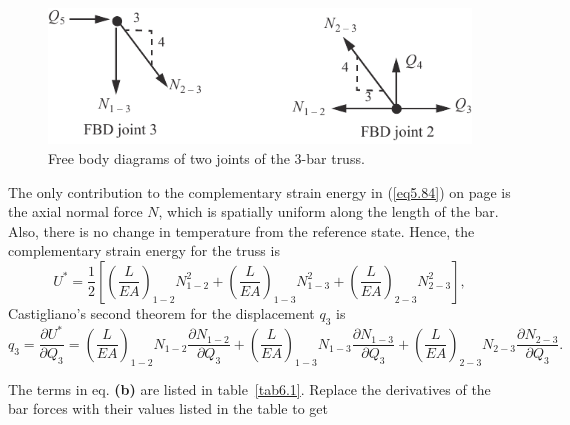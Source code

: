 \documentclass{AeroStructure-ERJohnson}
\begin{document}
\begin{example*}
\begin{figure}[!h]
\centerline{\includegraphics{Figure_6-7.pdf}}
\caption{Free body diagrams of two joints of the 3-bar truss.}\label{fig6.7}
\end{figure}

The only contribution to the complementary strain energy in (\ref{eq5.84}) on page \pageref{eq5.84} is the axial normal force $N$, which is spatially uniform along the length of the bar. Also, there is no change in temperature from the\vadjust{\vspace*{6pt}\pagebreak} reference state. Hence, the complementary strain energy for the truss is
\begin{equation*}
U^{*}=\frac{1}{2}\left[\left(\frac{L}{E A}\right)_{1-2} N_{1-2}^{2}+\left(\frac{L}{E A}\right)_{1-3} N_{1-3}^{2}+\left(\frac{L}{E A}\right)_{2-3} N^{2}_{2-3}\right],\tag{a}
\end{equation*}
Castigliano's second theorem for the displacement $q_3$ is
\begin{equation*}
q_{3}=\frac{\partial U^{*}}{\partial Q_{3}}=\left(\frac{L}{E A}\right)_{1-2} N_{1-2} \frac{\partial N_{1-2}}{\partial Q_{3}}+\left(\frac{L}{E A}\right)_{1-3} N_{1-3} \frac{\partial N_{1-3}}{\partial Q_{3}}+\left(\frac{L}{E A}\right)_{2-3} N_{2-3} \frac{\partial N_{2-3}}{\partial Q_{3}}.\tag{b}
\end{equation*}

\vspace*{-1pc}

\noindent The terms in eq. \textbf{(b)} are listed in table~\ref{tab6.1}. Replace the derivatives of the bar forces with their values listed in the table to get

\begin{table}[!h]%
\vspace*{-1pc}
\end{table}


\end{example*}
\end{document}
